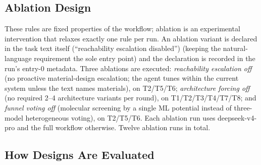 \subsection{Ablation Design}

These rules are fixed properties of the workflow; ablation is
an experimental intervention that relaxes exactly one rule per run.
An ablation variant is declared in the task text itself (``reachability
escalation disabled'') (keeping the natural-language requirement the sole
entry point) and the declaration is recorded in the run's entry-0 metadata.
Three ablations are executed: \emph{reachability escalation off} (no proactive
material-design escalation; the agent tunes within the current system unless
the text names materials), on T2/T5/T6; \emph{architecture forcing off} (no
required 2--4 architecture variants per round), on T1/T2/T3/T4/T7/T8; and
\emph{funnel voting off} (molecular screening by a single ML potential
instead of three-model heterogeneous voting), on T2/T5/T6. Each ablation run
uses deepseek-v4-pro and the full workflow otherwise. Twelve ablation runs
in total.

\subsection{How Designs Are Evaluated}

